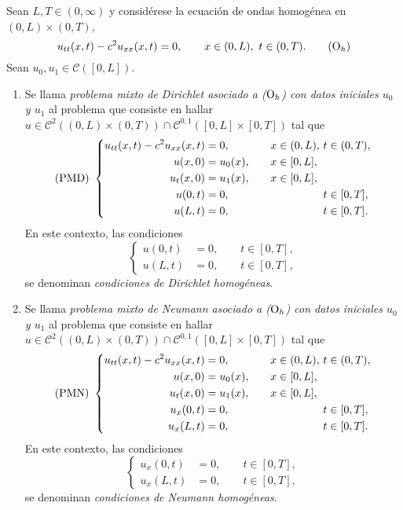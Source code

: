 \documentclass[a4paper, 12pt, extrafontsizes]{memoir}
\begin{document}
\begin{definition}\label{def:3.3.1}
    Sean $L,T \in (0,\infty)$ y considérese la ecuación de ondas homogénea en $(0,L) \times (0,T)$,
    \[u_{tt}(x,t) - c^2u_{xx}(x,t) = 0, \qquad x \in (0,L), \ t\in(0,T). \tag{$\textup{O}_h$}\]
    Sean $u_0,u_1 \in \mathcal{C}([0,L])$.
    \begin{enumerate}
        \item Se llama \emph{problema mixto de Dirichlet asociado a \textup{($\textup{O}_h$)} con datos iniciales $u_0$ y $u_1$} al problema que consiste en hallar $u \in \mathcal{C}^2((0,L) \times (0,T)) \cap \mathcal{C}^{0,1}([0,L] \times [0,T])$ tal que
        \[
        \textup{(PMD)} \ \left\{\begin{alignedat}{5}
            u_{tt}(x,t)-c^2u_{xx}(x,t) &= 0, \qquad & x &\in (0,L), \ & t &\in (0,T), \\
            u(x,0) &= u_0(x), \qquad & x &\in [0,L], & & \\
            u_t(x,0) &= u_1(x), \qquad & x &\in [0,L], & & \\
            u(0,t) &= 0, \qquad & & & t &\in [0,T], \\
            u(L,t) &= 0, \qquad & & & t &\in [0,T].
        \end{alignedat}\right.
        \]
        En este contexto, las condiciones
        \[\left\{\begin{alignedat}{1}
            u(0,t) &= 0, \qquad t \in [0,T], \\
            u(L,t) &= 0, \qquad t \in [0,T],
        \end{alignedat}\right.\]
        se denominan \emph{condiciones de Dirichlet homogéneas}.
        \item Se llama \emph{problema mixto de Neumann asociado a \textup{($\textup{O}_h$)} con datos iniciales $u_0$ y $u_1$} al problema que consiste en hallar $u \in \mathcal{C}^2((0,L) \times (0,T)) \cap \mathcal{C}^{0,1}([0,L] \times [0,T])$ tal que
        \[
        \textup{(PMN)} \ \left\{\begin{alignedat}{5}
            u_{tt}(x,t)-c^2u_{xx}(x,t) &= 0, \qquad & x &\in (0,L), \ & t &\in (0,T), \\
            u(x,0) &= u_0(x), \qquad & x &\in [0,L], & & \\
            u_t(x,0) &= u_1(x), \qquad & x &\in [0,L], & & \\
            u_x(0,t) &= 0, \qquad & & & t &\in [0,T], \\
            u_x(L,t) &= 0, \qquad & & & t &\in [0,T].
        \end{alignedat}\right.
        \]
        En este contexto, las condiciones
        \[\left\{\begin{alignedat}{1}
            u_x(0,t) &= 0, \qquad t \in [0,T], \\
            u_x(L,t) &= 0, \qquad t \in [0,T],
        \end{alignedat}\right.\]
        se denominan \emph{condiciones de Neumann homogéneas}.
    \end{enumerate}
\end{definition}
\end{document}
